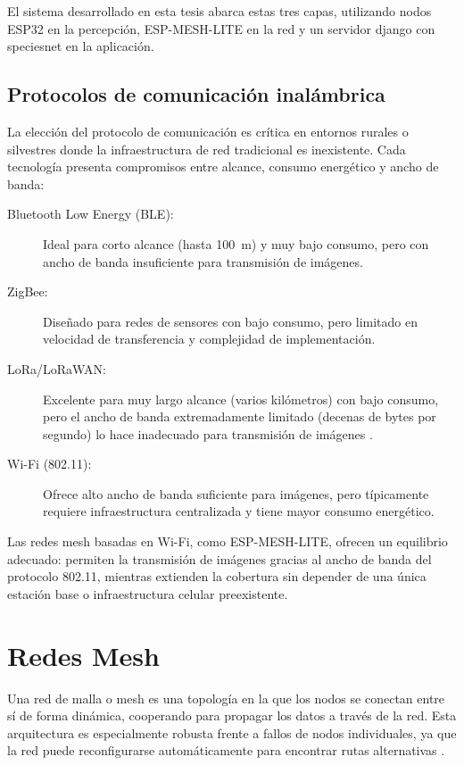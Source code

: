 \documentclass[a4paper, 12pt]{report}
\begin{document}
El sistema desarrollado en esta tesis abarca estas tres capas, utilizando
nodos \gls{ESP32} en la percepción, \gls{ESP-MESH-LITE} en la red y un servidor
\gls{django} con \gls{speciesnet} en la aplicación.

\subsection{Protocolos de comunicación inalámbrica}

La elección del protocolo de comunicación es crítica en entornos rurales o
silvestres donde la infraestructura de red tradicional es inexistente. Cada
tecnología presenta compromisos entre alcance, consumo energético y ancho
de banda:

\begin{description}
  \item[Bluetooth Low Energy (BLE):] Ideal para corto alcance (hasta \qty{100}{m})
    y muy bajo consumo, pero con ancho de banda insuficiente para
    transmisión de imágenes.
  \item[ZigBee:] Diseñado para redes de sensores con bajo consumo, pero
    limitado en velocidad de transferencia y complejidad de implementación.
  \item[LoRa/LoRaWAN:] Excelente para muy largo alcance (varios kilómetros)
    con bajo consumo, pero el ancho de banda extremadamente limitado
    (decenas de bytes por segundo) lo hace inadecuado para transmisión
    de imágenes \cite{whytock2023iridium}.
  \item[Wi-Fi (802.11):] Ofrece alto ancho de banda suficiente para imágenes,
    pero típicamente requiere infraestructura centralizada y tiene mayor
    consumo energético.
\end{description}

Las redes \gls{mesh} basadas en Wi-Fi, como \gls{ESP-MESH-LITE}, ofrecen un equilibrio
adecuado: permiten la transmisión de imágenes gracias al ancho de banda del
protocolo 802.11, mientras extienden la cobertura sin depender de una única
estación base o infraestructura celular preexistente.

\section{Redes Mesh}

Una red de malla o \gls{mesh} es una topología en la que los nodos se conectan
entre sí de forma dinámica, cooperando para propagar los datos a través de la
red. Esta arquitectura es especialmente robusta frente a fallos de nodos
individuales, ya que la red puede reconfigurarse automáticamente para encontrar
rutas alternativas \cite{espmesh2023}.
\end{document}
